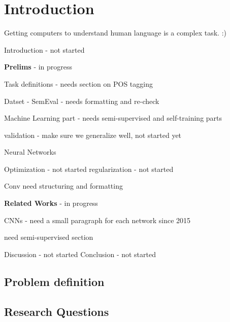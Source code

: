 \chapter{Introduction}

Getting computers to understand human language is a complex task. :)

Introduction - not started

\textbf{Prelims} - in progress

Task definitions - needs section on POS tagging

Datset -
SemEval - needs formatting and re-check  

Machine Learning part - needs semi-supervised and self-training parts

validation - make sure we generalize well, not started yet

Neural Networks

Optimization - not started
regularization - not started


Conv need structuring and formatting


\textbf{Related Works} - in progress
    
    CNNs - need a small paragraph for each network since 2015

need semi-supervised section


Discussion - not started
Conclusion - not started


\section{Problem definition}


\section{Research Questions}

